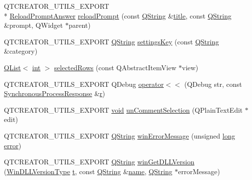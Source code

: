 \begin{DoxyCompactItemize}
Q\-T\-C\-R\-E\-A\-T\-O\-R\-\_\-\-U\-T\-I\-L\-S\-\_\-\-E\-X\-P\-O\-R\-T \\*
\hyperlink{namespace_utils_a4b02d8e41b34d9ba5605aa6235965efb}{Reload\-Prompt\-Answer} \hyperlink{namespace_utils_ac0810749b06ed4d230efcf4a24666667}{reload\-Prompt} (const \hyperlink{group___u_a_v_objects_plugin_gab9d252f49c333c94a72f97ce3105a32d}{Q\-String} \&\hyperlink{_parse_e_k_f_log_8m_a5df555a5fed35967e041e4abd1269b4e}{title}, const \hyperlink{group___u_a_v_objects_plugin_gab9d252f49c333c94a72f97ce3105a32d}{Q\-String} \&prompt, Q\-Widget $\ast$parent)
\item 
Q\-T\-C\-R\-E\-A\-T\-O\-R\-\_\-\-U\-T\-I\-L\-S\-\_\-\-E\-X\-P\-O\-R\-T \hyperlink{group___u_a_v_objects_plugin_gab9d252f49c333c94a72f97ce3105a32d}{Q\-String} \hyperlink{namespace_utils_a9d565bb385c00080db591e6bcd80f934}{settings\-Key} (const \hyperlink{group___u_a_v_objects_plugin_gab9d252f49c333c94a72f97ce3105a32d}{Q\-String} \&category)
\item 
\hyperlink{class_q_list}{Q\-List}$<$ \hyperlink{ioapi_8h_a787fa3cf048117ba7123753c1e74fcd6}{int} $>$ \hyperlink{namespace_utils_a83145cfcb4c857f7b60f65d03e9e2b61}{selected\-Rows} (const Q\-Abstract\-Item\-View $\ast$view)
\item 
Q\-T\-C\-R\-E\-A\-T\-O\-R\-\_\-\-U\-T\-I\-L\-S\-\_\-\-E\-X\-P\-O\-R\-T Q\-Debug \hyperlink{namespace_utils_a23baba2ec67c78730212cc29b90bf43a}{operator$<$$<$} (Q\-Debug str, const \hyperlink{struct_utils_1_1_synchronous_process_response}{Synchronous\-Process\-Response} \&\hyperlink{glext_8h_abe08814c2f72843fde4d8df41440d5a0}{r})
\item 
Q\-T\-C\-R\-E\-A\-T\-O\-R\-\_\-\-U\-T\-I\-L\-S\-\_\-\-E\-X\-P\-O\-R\-T \hyperlink{group___u_a_v_objects_plugin_ga444cf2ff3f0ecbe028adce838d373f5c}{void} \hyperlink{namespace_utils_a50f750da3c42852f02983eed80847919}{un\-Comment\-Selection} (Q\-Plain\-Text\-Edit $\ast$edit)
\item 
Q\-T\-C\-R\-E\-A\-T\-O\-R\-\_\-\-U\-T\-I\-L\-S\-\_\-\-E\-X\-P\-O\-R\-T \hyperlink{group___u_a_v_objects_plugin_gab9d252f49c333c94a72f97ce3105a32d}{Q\-String} \hyperlink{namespace_utils_a88cd1d3b7b4907b09a4fa1baf2794a4b}{win\-Error\-Message} (unsigned \hyperlink{ioapi_8h_a3c7b35ad9dab18b8310343c201f7b27e}{long} \hyperlink{uavobjecttemplate_8m_ae37d8f40ba76a59d04a674d824e8721f}{error})
\item 
Q\-T\-C\-R\-E\-A\-T\-O\-R\-\_\-\-U\-T\-I\-L\-S\-\_\-\-E\-X\-P\-O\-R\-T \hyperlink{group___u_a_v_objects_plugin_gab9d252f49c333c94a72f97ce3105a32d}{Q\-String} \hyperlink{namespace_utils_a95863cc1ee8f125ee968be3e44da744e}{win\-Get\-D\-L\-L\-Version} (\hyperlink{namespace_utils_a8a09ecaa3bd4054c9ec43e90ec1a355e}{Win\-D\-L\-L\-Version\-Type} \hyperlink{glext_8h_a00140d6f5c548b26daf170bf16e86a6d}{t}, const \hyperlink{group___u_a_v_objects_plugin_gab9d252f49c333c94a72f97ce3105a32d}{Q\-String} \&\hyperlink{glext_8h_ad977737dfc9a274a62741b9500c49a32}{name}, \hyperlink{group___u_a_v_objects_plugin_gab9d252f49c333c94a72f97ce3105a32d}{Q\-String} $\ast$error\-Message)
\end{DoxyCompactItemize}


